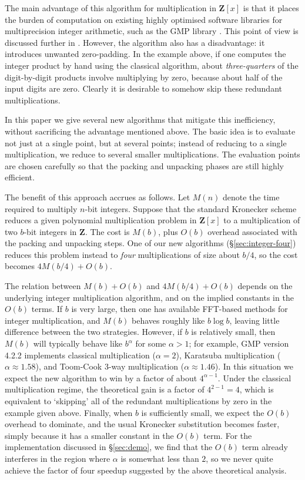 \documentclass{amsart}
\newcommand{\ZZ}{\mathbf{Z}}
\theoremstyle{definition}
\theoremstyle{remark}
\begin{document}
The main advantage of this algorithm for multiplication in $\ZZ[x]$ is that it places the burden of computation on existing highly optimised software libraries for multiprecision integer arithmetic, such as the GMP library \cite{gmp}. This point of view is discussed further in \cite{fateman}. However, the algorithm also has a disadvantage: it introduces unwanted zero-padding. In the example above, if one computes the integer product by hand using the classical algorithm, about \emph{three-quarters} of the digit-by-digit products involve multiplying by zero, because about half of the input digits are zero. Clearly it is desirable to somehow skip these redundant multiplications.

In this paper we give several new algorithms that mitigate this inefficiency, without sacrificing the advantage mentioned above. The basic idea is to evaluate not just at a single point, but at several points; instead of reducing to a single multiplication, we reduce to several smaller multiplications. The evaluation points are chosen carefully so that the packing and unpacking phases are still highly efficient.

The benefit of this approach accrues as follows. Let $M(n)$ denote the time required to multiply $n$-bit integers. Suppose that the standard Kronecker scheme reduces a given polynomial multiplication problem in $\ZZ[x]$ to a multiplication of two $b$-bit integers in $\ZZ$. The cost is $M(b)$, plus $O(b)$ overhead associated with the packing and unpacking steps. One of our new algorithms (\S\ref{sec:integer-four}) reduces this problem instead to \emph{four} multiplications of size about $b/4$, so the cost becomes $4M(b/4) + O(b)$.

The relation between $M(b) + O(b)$ and $4M(b/4) + O(b)$ depends on the underlying integer multiplication algorithm, and on the implied constants in the $O(b)$ terms. If $b$ is very large, then one has available FFT-based methods for integer multiplication, and $M(b)$ behaves roughly like $b \log b$, leaving little difference between the two strategies. However, if $b$ is relatively small, then $M(b)$ will typically behave like $b^\alpha$ for some $\alpha > 1$; for example, GMP version 4.2.2 implements classical multiplication ($\alpha = 2$), Karatsuba multiplication ($\alpha \approx 1.58$), and Toom-Cook 3-way multiplication ($\alpha \approx 1.46$). In this situation we expect the new algorithm to win by a factor of about $4^{\alpha - 1}$. Under the classical multiplication regime, the theoretical gain is a factor of $4^{2-1} = 4$, which is equivalent to `skipping' all of the redundant multiplications by zero in the example given above. Finally, when $b$ is sufficiently small, we expect the $O(b)$ overhead to dominate, and the usual Kronecker substitution becomes faster, simply because it has a smaller constant in the $O(b)$ term. For the implementation discussed in \S\ref{sec:demo}, we find that the $O(b)$ term already interferes in the region where $\alpha$ is somewhat less than $2$, so we never quite achieve the factor of four speedup suggested by the above theoretical analysis.
\end{document}
